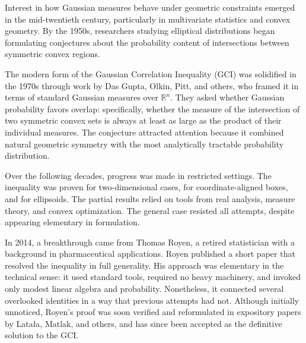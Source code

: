 \begin{historical}
Interest in how Gaussian measures behave under geometric constraints emerged in the mid-twentieth century, particularly in multivariate statistics and convex geometry. By the 1950s, researchers studying elliptical distributions began formulating conjectures about the probability content of intersections between symmetric convex regions.

The modern form of the Gaussian Correlation Inequality (GCI) was solidified in the 1970s through work by Das Gupta, Olkin, Pitt, and others, who framed it in terms of standard Gaussian measures over \(\mathbb{R}^n\). They asked whether Gaussian probability favors overlap: specifically, whether the measure of the intersection of two symmetric convex sets is always at least as large as the product of their individual measures. The conjecture attracted attention because it combined natural geometric symmetry with the most analytically tractable probability distribution.

Over the following decades, progress was made in restricted settings. The inequality was proven for two-dimensional cases, for coordinate-aligned boxes, and for ellipsoids. The partial results relied on tools from real analysis, measure theory, and convex optimization. The general case resisted all attempts, despite appearing elementary in formulation.

In 2014, a breakthrough came from Thomas Royen, a retired statistician with a background in pharmaceutical applications. Royen published a short paper that resolved the inequality in full generality. His approach was elementary in the technical sense: it used standard tools, required no heavy machinery, and invoked only modest linear algebra and probability. Nonetheless, it connected several overlooked identities in a way that previous attempts had not. Although initially unnoticed, Royen's proof was soon verified and reformulated in expository papers by Latała, Matlak, and others, and has since been accepted as the definitive solution to the GCI.
\end{historical}
